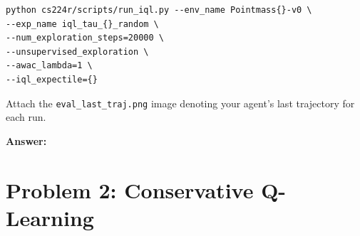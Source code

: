 \documentclass[12pt]{article}
\newcommand{\answer}[1]{{\bf \color{red}Answer:\\ #1}}
\begin{document}
\begin{enumerate}
\begin{tcolorbox}[width=\linewidth, sharp corners=all, colback=white!95!black]
\begin{verbatim}
python cs224r/scripts/run_iql.py --env_name Pointmass{}-v0 \
--exp_name iql_tau_{}_random \
--num_exploration_steps=20000 \
--unsupervised_exploration \
--awac_lambda=1 \
--iql_expectile={}
\end{verbatim}
\end{tcolorbox}

Attach the \texttt{eval\_last\_traj.png} image denoting your agent's last trajectory for each run.

\answer{
}

\end{enumerate}

\newpage

\section*{Problem 2: Conservative Q-Learning}
\end{document}

